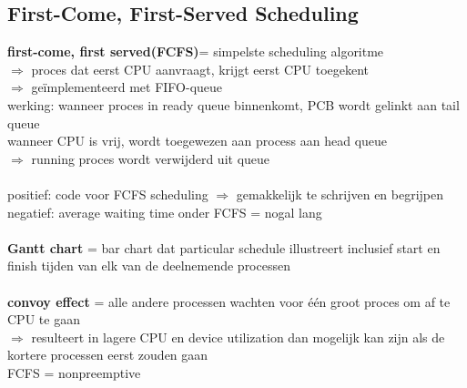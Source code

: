 \documentclass{report}
\begin{document}
\subsection{First-Come, First-Served Scheduling}
\textbf{first-come, first served(FCFS)}= simpelste scheduling algoritme
\\$\Rightarrow$ proces dat eerst CPU aanvraagt, krijgt eerst CPU toegekent
\\$\Rightarrow$ ge\"implementeerd met FIFO-queue
\\werking: wanneer proces in ready queue binnenkomt, PCB wordt gelinkt aan tail queue
\\wanneer CPU is vrij, wordt toegewezen aan process aan head queue
\\$\Rightarrow$ running proces wordt verwijderd uit queue
\\
\\positief: code voor FCFS scheduling $\Rightarrow$ gemakkelijk te schrijven en begrijpen
\\negatief: average waiting time onder FCFS = nogal lang
\\
\\\textbf{Gantt chart} = bar chart dat particular schedule illustreert inclusief start en finish tijden van elk van de deelnemende processen
\\
\\\textbf{convoy effect} = alle andere processen wachten voor \'e\'en groot proces om af te CPU te gaan 
\\$\Rightarrow$ resulteert in lagere CPU en device utilization dan mogelijk kan zijn als de kortere processen eerst zouden gaan
\\FCFS = nonpreemptive
\end{document}
